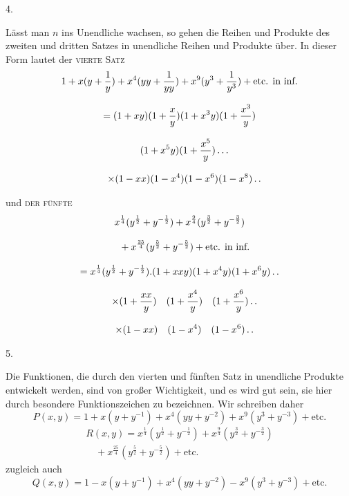 \begingroup
\renewcommand{\arraystretch}{1.45}

\par\medskip{}\centerline{4.}\nobreak\smallskip
Lässt man $n$ ins Unendliche wachsen, so gehen die Reihen und Produkte des zweiten und dritten Satzes in unendliche Reihen und Produkte über. In dieser Form lautet der \textsc{vierte Satz}
\[
\begin{gathered}
1+x(y+\frac1y)+x^4(yy+\frac1{yy})+x^9(y^3+\frac1{y^3})+\text{etc. in inf.}\\[8pt]
=(1+xy)(1+\frac xy)(1+x^3y)(1+\frac{x^3}y)\\[8pt]\quad{}(1+x^5y)(1+\frac{x^5}y)\mathinner{.\,.\,.}\\[8pt]
\quad\times(1-xx)(1-x^4)(1-x^6)(1-x^8)\mathinner{.\,.}
\end{gathered}
\]

und \textsc{der fünfte}
\[
\begin{gathered}
x^{\frac14}(y^{\frac12}+y^{-\frac12})+x^{\frac94}(y^{\frac32}+y^{-\frac32})\\[8pt]\quad{}+x^{\frac{25}4}(y^{\frac52}+y^{-\frac52})+\text{etc. in inf.}\\[8pt]
=x^{\frac14}(y^{\frac12}+y^{-\frac12}).(1+xxy)(1+x^4y)(1+x^6y)\mathinner{.\,.}\\[8pt]
\quad\times(1+\frac{xx}y)\quad(1+\frac{x^4}y)\quad(1+\frac{x^6}y)\mathinner{.\,.}\\[8pt]
\quad\times(1-xx)\quad(1-x^4)\quad(1-x^6)\mathinner{.\,.}
\end{gathered}
\]



\par\medskip{}\centerline{5.}\nobreak\smallskip
Die Funktionen, die durch den vierten und fünften Satz in unendliche Produkte entwickelt werden, sind von großer Wichtigkeit, und es wird gut sein, sie hier durch besondere Funktionszeichen zu bezeichnen. Wir schreiben daher
\[
P(x,y)=1+x(y+y^{-1})+x^4(yy+y^{-2})+x^9(y^3+y^{-3})+\text{etc.}
\]
\[
\begin{gathered}R(x,y)=x^{\frac14}(y^{\frac12}+y^{-\frac12})+x^{\frac94}(y^{\frac32}+y^{-\frac32})\\[8pt]\quad{}+x^{\frac{25}4}(y^{\frac52}+y^{-\frac52})+\text{etc.}\end{gathered}
\]
zugleich auch
\[
Q(x,y)=1-x(y+y^{-1})+x^4(yy+y^{-2})-x^9(y^3+y^{-3})+\text{etc.}
\]

